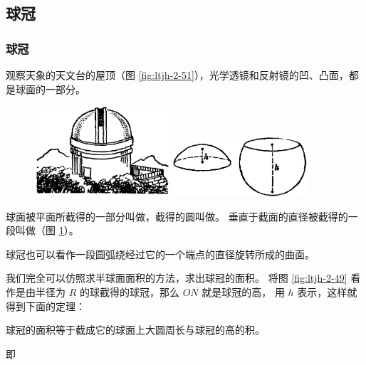 \subsection{球冠}\label{subsec:2-6}

\subsubsection{球冠}

观察天象的天文台的屋顶（图 \ref{fig:ltjh-2-51}），光学透镜和反射镜的凹、凸面，都是球面的一部分。

\begin{figure}[htbp]
    \centering
    \begin{minipage}[b]{7cm}
        \centering
        \includegraphics[width=5cm]{../pic/ltjh-ch2-51.png}
        \caption{}\label{fig:ltjh-2-51}
    \end{minipage}
    \qquad
    \begin{minipage}[b]{7cm}
        \centering
        \includegraphics[width=5cm]{../pic/ltjh-ch2-52.png}
        \caption{}\label{fig:ltjh-2-52}
    \end{minipage}
\end{figure}

球面被平面所截得的一部分叫做，截得的圆叫做。
垂直于截面的直径被截得的一段叫做（图 \ref{fig:ltjh-2-52}）。

球冠也可以看作一段圆弧绕经过它的一个端点的直径旋转所成的曲面。

我们完全可以仿照求半球面面积的方法，求出球冠的面积。
将图 \ref{fig:ltjh-2-49} 看作是由半径为 $R$ 的球截得的球冠，那么 $ON$ 就是球冠的高，
用 $h$ 表示，这样就得到下面的定理：

\begin{dingli}[定理][dl:qgdmj]
    球冠的面积等于截成它的球面上大圆周长与球冠的高的积。
    \begin{center}
     \end{center}
    \vspace*{-2.5em}即
\end{dingli}\vspace{1em}

